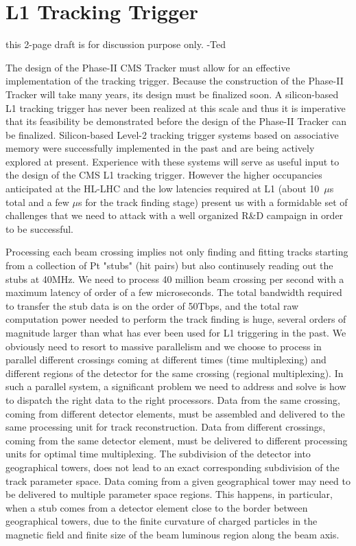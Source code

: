 \section{L1 Tracking Trigger}

this 2-page draft is for discussion purpose only. -Ted 


\noindent 

	The design of the Phase-II CMS Tracker must allow for an effective implementation of the tracking trigger.  Because the construction of the Phase-II Tracker will take many years, its design must be finalized soon.  A silicon-based L1 tracking trigger has never been realized at this scale and thus it is imperative that its feasibility be demonstrated before the design of the Phase-II Tracker can be finalized.  Silicon-based Level-2 tracking trigger systems based on associative memory were successfully implemented in the past and are being actively explored at present. Experience with these systems will serve as useful input to the design of the CMS L1 tracking trigger. However the higher occupancies anticipated at the HL-LHC and the low latencies required at L1 (about 10~$\mu$s total and a few $\mu$s for the track finding stage) present us with a formidable set of challenges that we need to attack with a well organized R\&D campaign in order to be successful. 

	Processing each beam crossing implies not only finding and fitting tracks starting from a collection of Pt "stubs" (hit pairs) but also continusely reading out the stubs at 40MHz. We need to process 40 million beam crossing per second with a maximum latency of order of a few microseconds. The total bandwidth required to transfer the stub data is on the order of 50Tbps, and the total raw computation power needed to perform the track finding is huge, several orders of magnitude larger than what has ever been used for L1 triggering in the past. We obviously need to resort to massive parallelism and we choose to process in parallel different crossings coming at different times (time multiplexing) and different regions of the detector for the same crossing (regional multiplexing). In such a parallel system, a significant problem we need to address and solve is how to dispatch the right data to the right processors. Data from the same crossing, coming from different detector elements, must be assembled and delivered to the same processing unit for track reconstruction. Data from different crossings, coming from the same detector element, must be delivered to different processing units for optimal time multiplexing. The subdivision of the detector into geographical towers, does not lead to an exact corresponding subdivision of the track parameter space. Data coming from a given geographical tower may need to be delivered to multiple parameter space regions. This happens, in particular, when a stub comes from a detector element close to the border between geographical towers, due to the finite curvature of charged particles in the magnetic field and finite size of the beam luminous region along the beam axis. 

